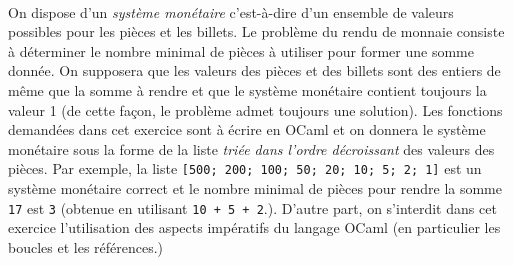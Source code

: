 \documentclass[11pt,a4paper]{article}
\begin{document}
\begin{Exercise*}[title = {type B}]\\
	On dispose d'un \textit{système monétaire} c'est-à-dire d'un ensemble de valeurs possibles pour les pièces et les billets. Le problème du rendu de monnaie consiste à déterminer le nombre minimal de pièces à utiliser pour former une somme donnée. On supposera que les valeurs des pièces et des billets sont des entiers de même que la somme à rendre et que le système monétaire contient toujours la valeur 1 (de cette façon, le problème admet toujours une solution). Les fonctions demandées dans cet exercice sont à écrire en OCaml et on donnera le système monétaire sous la forme de la liste \textit{triée dans l'ordre décroissant} des valeurs des pièces. Par exemple, la liste \texttt{[500; 200; 100; 50; 20; 10; 5; 2; 1]} est un système monétaire correct et le nombre minimal de pièces pour rendre la somme {\tt 17} est {\tt 3} (obtenue en utilisant {\tt 10 + 5 + 2}.). D'autre part, on s'interdit dans cet exercice l'utilisation des aspects impératifs du langage OCaml (en particulier les boucles et les références.)


\end{Exercise*}
\end{document}
